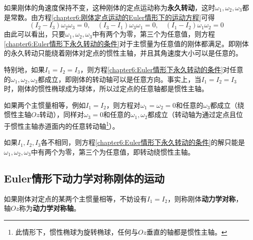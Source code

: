 如果刚体的角速度保持不变，这种刚体的定点运动称为{\bf 永久转动}，这时$\omega_1,\omega_2,\omega_3$都是常数。由方程\eqref{chapter6:刚体定点运动的Euler情形下的运动方程}可得
\begin{equation}
	(I_2-I_3)\omega_2\omega_3=0,\quad (I_3-I_1)\omega_3\omega_1=0,\quad (I_1-I_2)\omega_1\omega_2=0
	\label{chapter6:Euler情形下永久转动的条件}
\end{equation}
由此可以看出，只要$\omega_1,\omega_2,\omega_3$中有两个为零，第三个为任意值，则方程\eqref{chapter6:Euler情形下永久转动的条件}对于主惯量为任意值的刚体都满足。即刚体的永久转动只能绕着刚体对定点的惯性主轴，并且其角速度大小可以是任意的。

特别地，如果$I_1=I_2=I_3$，则方程\eqref{chapter6:Euler情形下永久转动的条件}对任意的$\omega_1,\omega_2,\omega_3$都成立，即刚体的转动轴可以是任意方向。事实上，当$I_1=I_2=I_3$时，刚体的惯性椭球成为球体，所以过定点的任意轴都是惯性主轴。

如果两个主惯量相等，例如$I_1=I_2$，则方程对$\omega_1=\omega_2=0$和任意的$\omega_3$都成立（绕惯性主轴$Oz$转动），同样对$\omega_3=0$和任意的$\omega_1,\omega_2$都成立（转动轴为通过定点且位于惯性主轴赤道面内的任意转动轴\footnote{此情形下，惯性椭球为旋转椭球，任何与$Oz$垂直的轴都是惯性主轴。}）。

如果$I_1,I_2,I_3$各不相同，则方程\eqref{chapter6:Euler情形下永久转动的条件}的解只能是$\omega_1,\omega_2,\omega_3$中有两个为零，第三个为任意值，即转动绕惯性主轴。

\subsection{Euler情形下动力学对称刚体的运动}\label{chapter6:subsection-Euler情形下动力学对称刚体的运动}

如果刚体对定点的某两个主惯量相等，不妨设有$I_1=I_2$，则称刚体{\bf 动力学对称}，轴$Oz$称为{\bf 动力学对称轴}。


